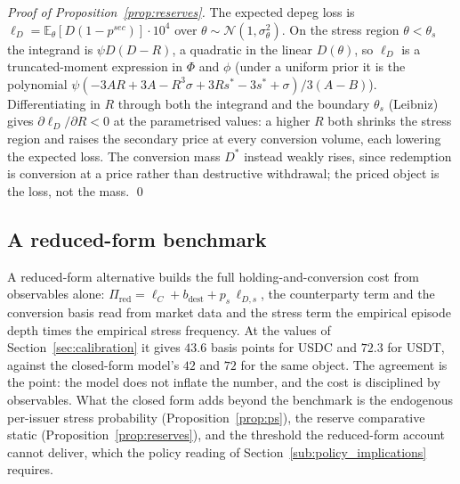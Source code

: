 \begin{proof}[Proof of Proposition~\ref{prop:reserves}]
The expected depeg loss is $\ell_D = \mathbb{E}_\theta[D(1-p^{sec})]\cdot 10^4$ over $\theta\sim\mathcal{N}(1,\sigma_\theta^2)$. On the stress region $\theta<\theta_s$ the integrand is $\psi D(D-R)$, a quadratic in the linear $D(\theta)$, so $\ell_D$ is a truncated-moment expression in $\Phi$ and $\phi$ (under a uniform prior it is the polynomial $\psi(-3AR+3A-R^3\sigma+3Rs^*-3s^*+\sigma)/3(A-B)$). Differentiating in $R$ through both the integrand and the boundary $\theta_s$ (Leibniz) gives $\partial\ell_D/\partial R < 0$ at the parametrised values: a higher $R$ both shrinks the stress region and raises the secondary price at every conversion volume, each lowering the expected loss. The conversion mass $D^*$ instead weakly rises, since redemption is conversion at a price rather than destructive withdrawal; the priced object is the loss, not the mass. \qed
\end{proof}

\subsection{A reduced-form benchmark}\label{app:decomposition}

A reduced-form alternative builds the full holding-and-conversion cost from observables alone: $\Pi_{\text{red}} = \ell_C + b_{\text{dest}} + p_s\,\ell_{D,s}$, the counterparty term and the conversion basis read from market data and the stress term the empirical episode depth times the empirical stress frequency. At the values of Section~\ref{sec:calibration} it gives $43.6$ basis points for USDC and $72.3$ for USDT, against the closed-form model's $42$ and $72$ for the same object. The agreement is the point: the model does not inflate the number, and the cost is disciplined by observables. What the closed form adds beyond the benchmark is the endogenous per-issuer stress probability (Proposition~\ref{prop:ps}), the reserve comparative static (Proposition~\ref{prop:reserves}), and the threshold the reduced-form account cannot deliver, which the policy reading of Section~\ref{sub:policy_implications} requires.
